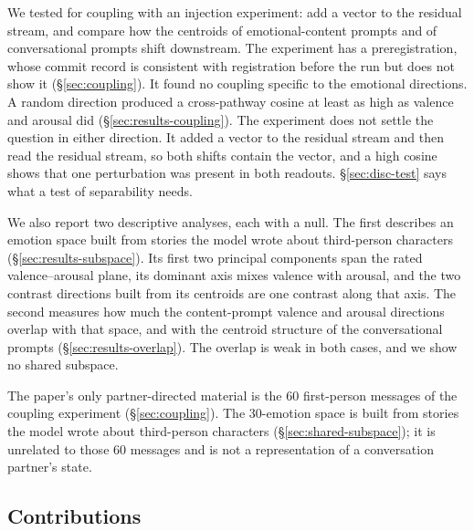 \documentclass[11pt,a4paper]{article}
\begin{document}
We tested for coupling with an injection experiment: add a vector to the residual stream, and compare how the centroids of emotional-content prompts and of conversational prompts shift downstream. The experiment has a preregistration, whose commit record is consistent with registration before the run but does not show it (\S\ref{sec:coupling}). It found no coupling specific to the emotional directions. A random direction produced a cross-pathway cosine at least as high as valence and arousal did (\S\ref{sec:results-coupling}). The experiment does not settle the question in either direction. It added a vector to the residual stream and then read the residual stream, so both shifts contain the vector, and a high cosine shows that one perturbation was present in both readouts. \S\ref{sec:disc-test} says what a test of separability needs.

We also report two descriptive analyses, each with a null. The first describes an emotion space built from stories the model wrote about third-person characters (\S\ref{sec:results-subspace}). Its first two principal components span the rated valence--arousal plane, its dominant axis mixes valence with arousal, and the two contrast directions built from its centroids are one contrast along that axis. The second measures how much the content-prompt valence and arousal directions overlap with that space, and with the centroid structure of the conversational prompts (\S\ref{sec:results-overlap}). The overlap is weak in both cases, and we show no shared subspace.

The paper's only partner-directed material is the 60 first-person messages of the coupling experiment (\S\ref{sec:coupling}). The 30-emotion space is built from stories the model wrote about third-person characters (\S\ref{sec:shared-subspace}); it is unrelated to those 60 messages and is not a representation of a conversation partner's state.

\subsection*{Contributions}
\end{document}

